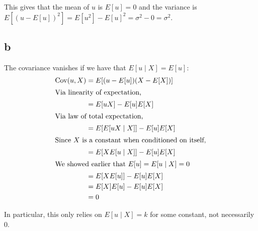\documentclass[12pt,letterpaper]{article}
\theoremstyle{definition}
\DeclareMathOperator{\Cov}{Cov}
\begin{document}
This gives that the mean of $u$ is $E[u] = 0$ and the variance is $E[(u - E[u])^2] = E[u^2] - E[u]^2 = \sigma^2 - 0 = \sigma^2$.

\subsection*{b}

The covariance vanishes if we have that $E[u \mid X] = E[u]$:
\begin{align*}
  \Cov(u, X) &= E[(u - E[u])(X - E[X])] \\
  \intertext{Via linearity of expectation,}
             &= E[uX] - E[u]E[X] \\
  \intertext{Via law of total expectation,}
             &= E[E[uX \mid X]] - E[u]E[X] \\
  \intertext{Since $X$ is a constant when conditioned on itself,}
             &= E[XE[u \mid X]] - E[u]E[X] \\
             \intertext{We showed earlier that $E[u] = E[u \mid X] = 0$}
             &= E[XE[u]] - E[u]E[X] \\
             &= E[X]E[u] - E[u]E[X] \\
             &= 0
\end{align*}

In particular, this only relies on $E[u \mid X] = k$ for some constant, not necessarily 0.
\end{document}
